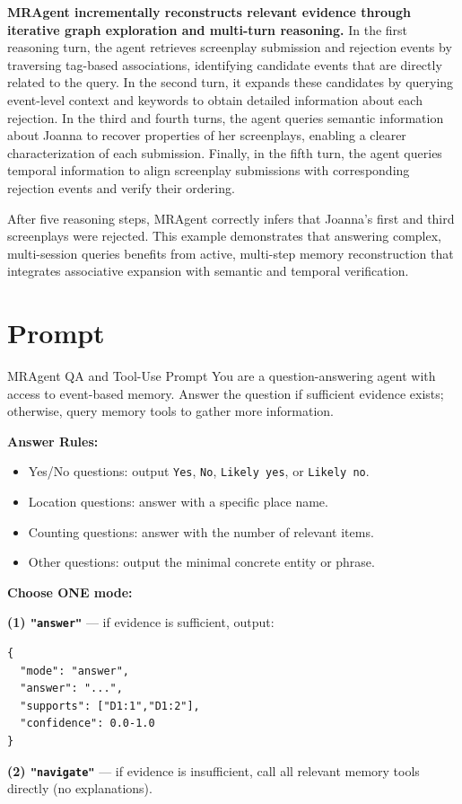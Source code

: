 \documentclass{llmxive}
\begin{document}
\textbf{MRAgent incrementally reconstructs relevant evidence through iterative
graph exploration and multi-turn reasoning.}
In the first reasoning turn, the agent retrieves screenplay submission and
rejection events by traversing tag-based associations, identifying candidate
events that are directly related to the query.
In the second turn, it expands these candidates by querying event-level context
and keywords to obtain detailed information about each rejection.
In the third and fourth turns, the agent queries semantic information about
Joanna to recover properties of her screenplays, enabling a clearer
characterization of each submission.
Finally, in the fifth turn, the agent queries temporal information to align
screenplay submissions with corresponding rejection events and verify their
ordering.

After five reasoning steps, MRAgent correctly infers that Joanna’s first and
third screenplays were rejected.
This example demonstrates that answering complex, multi-session queries
benefits from active, multi-step memory reconstruction that integrates
associative expansion with semantic and temporal verification.
\section{Prompt}

\begin{promptbox}{MRAgent QA and Tool-Use Prompt}
You are a question-answering agent with access to event-based memory.
Answer the question if sufficient evidence exists; otherwise, query memory tools to gather more information.

\textbf{Answer Rules:}
\begin{itemize}[leftmargin=1.25em,itemsep=2pt,topsep=2pt]
  \item Yes/No questions: output \texttt{Yes}, \texttt{No}, \texttt{Likely yes}, or \texttt{Likely no}.
  \item Location questions: answer with a specific place name.
  \item Counting questions: answer with the number of relevant items.
  \item Other questions: output the minimal concrete entity or phrase.
\end{itemize}

\textbf{Choose ONE mode:}

\textbf{(1) \texttt{"answer"}} — if evidence is sufficient, output:
\begin{lstlisting}[style=json]
{
  "mode": "answer",
  "answer": "...",
  "supports": ["D1:1","D1:2"],
  "confidence": 0.0-1.0
}
\end{lstlisting}

\textbf{(2) \texttt{"navigate"}} — if evidence is insufficient, call all relevant memory tools directly (no explanations).
\end{promptbox}
\end{document}
